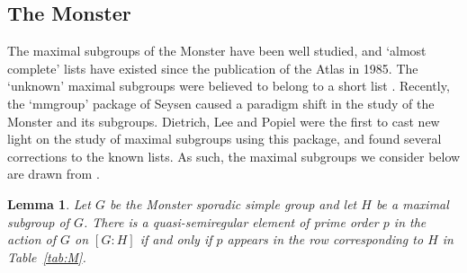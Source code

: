 \documentclass{article}
\newtheorem{lem}[thm]{Lemma}
\theoremstyle{remark}
\theoremstyle{definition}
\newcommand{\qsre}{quasi-semiregular element}
\begin{document}
\subsection{The Monster}

The maximal subgroups of the Monster have been well studied, and `almost complete' lists have existed since the publication of the Atlas \cite{ATLAS} in 1985. The `unknown' maximal subgroups were believed to belong to a short list \cite{Wilson}. Recently, the `mmgroup' package of Seysen \cite{Seysen1,Seysen2,Seysen3} caused a paradigm shift in the study of the Monster and its subgroups.  Dietrich, Lee and Popiel \cite{DLP} were the first to cast new light on the study of maximal subgroups using this package, and found several corrections to the known lists. As such, the maximal subgroups we consider below are drawn from \cite{DLP,DLPP}.

\begin{lem}
\label{lem: sporadic and monster}
    Let $G$ be the Monster sporadic simple group and let $H$ be a maximal subgroup of $G$. There is a {\qsre} of prime order $p$ in the action of $G$ on $[G:H]$ if and only if $p$ appears in the row corresponding to $H$ in Table~\ref{tab:M}.
\end{lem}
\end{document}
